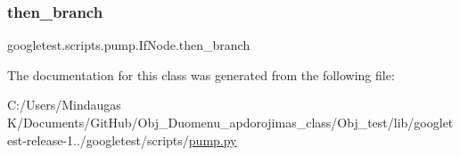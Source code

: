 \subsubsection{\texorpdfstring{then\_branch}{then\_branch}}
{\footnotesize\ttfamily googletest.\+scripts.\+pump.\+If\+Node.\+then\+\_\+branch}



The documentation for this class was generated from the following file\+:\begin{DoxyCompactItemize}
\item 
C\+:/\+Users/\+Mindaugas K/\+Documents/\+Git\+Hub/\+Obj\+\_\+\+Duomenu\+\_\+apdorojimas\+\_\+class/\+Obj\+\_\+test/lib/googletest-\/release-\/1../googletest/scripts/\mbox{\hyperlink{_obj__test_2lib_2googletest-release-1_88_81_2googletest_2scripts_2pump_8py}{pump.\+py}}\end{DoxyCompactItemize}
